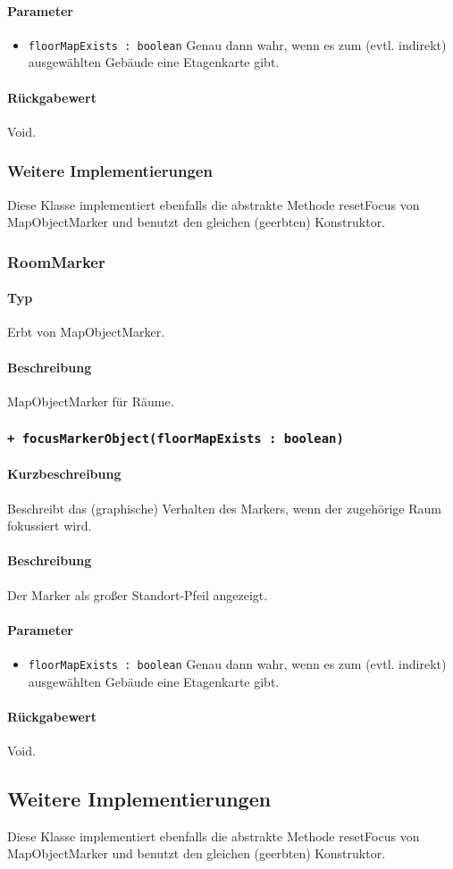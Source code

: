 \paragraph*{Parameter}
\begin{itemize}
    \item \texttt{floorMapExists : boolean} Genau dann wahr, wenn es zum (evtl. indirekt) ausgewählten Gebäude eine Etagenkarte gibt.
\end{itemize}
\paragraph*{Rückgabewert}
Void.

\subsubsection*{Weitere Implementierungen}
Diese Klasse implementiert ebenfalls die abstrakte Methode resetFocus von MapObjectMarker 
und benutzt den gleichen (geerbten) Konstruktor.

\subsubsection{RoomMarker}
\paragraph*{Typ} 
Erbt von MapObjectMarker.
\paragraph*{Beschreibung}
MapObjectMarker für Räume.

\subsubsection*{\texttt{+ focusMarkerObject(floorMapExists : boolean)}}%
\paragraph*{Kurzbeschreibung}
Beschreibt das (graphische) Verhalten des Markers, wenn der zugehörige Raum fokussiert wird.
\paragraph*{Beschreibung}
Der Marker als großer Standort-Pfeil angezeigt.
\paragraph*{Parameter}
\begin{itemize}
    \item \texttt{floorMapExists : boolean} Genau dann wahr, wenn es zum (evtl. indirekt) ausgewählten Gebäude eine Etagenkarte gibt.
\end{itemize}
\paragraph*{Rückgabewert}
Void.

\subsection*{Weitere Implementierungen}
Diese Klasse implementiert ebenfalls die abstrakte Methode resetFocus von MapObjectMarker 
und benutzt den gleichen (geerbten) Konstruktor.

